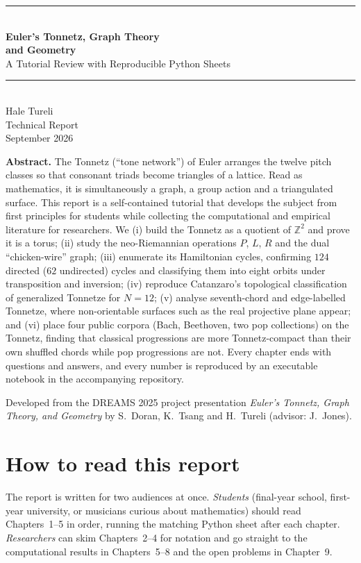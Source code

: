 \documentclass[11pt,a4paper,oneside]{report}
\theoremstyle{definition}
\theoremstyle{remark}
\newcommand{\Z}{\mathbb{Z}}\newcommand{\QQ}{\mathbb{Q}}
\begin{document}
\begin{titlepage}
\centering
\vspace*{2.2cm}
{\color{accent}\rule{\linewidth}{1pt}}\\[14pt]
{\Huge\bfseries Euler's Tonnetz, Graph Theory\\[6pt] and Geometry}\\[12pt]
{\LARGE A Tutorial Review with Reproducible Python Sheets}\\[10pt]
{\color{accent}\rule{\linewidth}{1pt}}\\[2cm]
{\Large Hale Tureli}\\[6pt]
{\large Technical Report}\\[4pt]
{\normalsize September 2026}\\[2.5cm]
\begin{minipage}{0.82\linewidth}\small
\textbf{Abstract.} The Tonnetz (``tone network'') of Euler arranges the twelve pitch classes so that consonant
triads become triangles of a lattice. Read as mathematics, it is simultaneously a graph, a group action and a
triangulated surface. This report is a self-contained tutorial that develops the subject from first principles
for students while collecting the computational and empirical literature for researchers. We (i) build the
Tonnetz as a quotient of $\Z^2$ and prove it is a torus; (ii) study the neo-Riemannian operations $P$, $L$, $R$
and the dual ``chicken-wire'' graph; (iii) enumerate its Hamiltonian cycles, confirming $124$ directed
($62$ undirected) cycles and classifying them into eight orbits under transposition and inversion;
(iv) reproduce Catanzaro's topological classification of generalized Tonnetze for $N=12$;
(v) analyse seventh-chord and edge-labelled Tonnetze, where non-orientable surfaces such as the real
projective plane appear; and (vi) place four public corpora (Bach, Beethoven, two pop collections) on the
Tonnetz, finding that classical progressions are more Tonnetz-compact than their own shuffled chords while pop
progressions are not. Every chapter ends with questions and answers, and every number is reproduced by an
executable notebook in the accompanying repository.
\end{minipage}
\vfill
{\small Developed from the DREAMS 2025 project presentation \emph{Euler's Tonnetz, Graph Theory, and Geometry}
by S.~Doran, K.~Tsang and H.~Tureli (advisor: J.~Jones).}
\end{titlepage}

\tableofcontents
\clearpage

\chapter*{How to read this report}
The report is written for two audiences at once. \emph{Students} (final-year school, first-year university, or
musicians curious about mathematics) should read Chapters~1--5 in order, running the matching Python sheet after
each chapter. \emph{Researchers} can skim Chapters~2--4 for notation and go straight to the computational results
in Chapters~5--8 and the open problems in Chapter~9.
\end{document}
